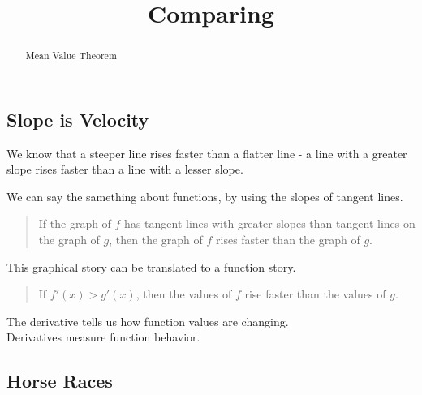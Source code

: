 \documentclass{ximera}
\title{Comparing}
\begin{document}
\begin{abstract}
Mean Value Theorem
\end{abstract}
\maketitle






\subsection*{Slope is Velocity}



We know that a steeper line rises faster than a flatter line - a line with a greater slope rises faster than a line with a lesser slope. 


We can say the samething about functions, by using the slopes of tangent lines.


\begin{quote}

If the graph of $f$ has tangent lines with greater slopes than tangent lines on the graph of $g$, then the graph of $f$ rises faster than the graph of $g$.

\end{quote}


This graphical story can be translated to a function story.  


\begin{quote}

If $f'(x) > g'(x)$, then the values of $f$ rise faster than the values of $g$.

\end{quote}





The derivative tells us how function values are changing. \\

Derivatives measure function behavior. \\






















\subsection*{Horse Races}
\end{document}
